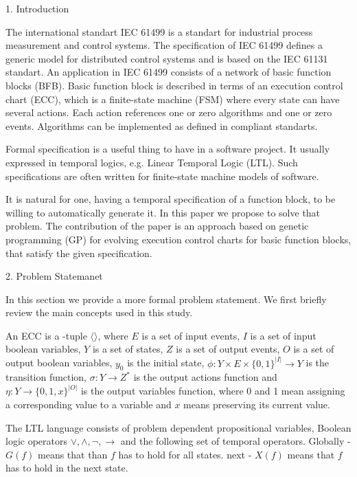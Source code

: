 1. Introduction

The international standart IEC 61499 is a standart for industrial process measurement and control systems.
The specification of IEC 61499 defines a generic model for distributed control systems and is based on the IEC 61131 standart.
An application in IEC 61499 consists of a network of basic function blocks (BFB). Basic function block is described in terms
of an execution control chart (ECC), which is a finite-state machine (FSM) where every state can have several actions.
Each action references one or zero algorithms and one or zero events. Algorithms can be implemented as defined in compliant standarts.

Formal specification is a useful thing to have in a software project. It usually expressed in temporal logics, e.g.
Linear Temporal Logic (LTL). Such specifications are often written for finite-state machine models of software.

It is natural for one, having a temporal specification of a function block, to be willing to automatically generate it.
In this paper we propose to solve that problem. The contribution of the paper is an approach based on genetic programming (GP)
for evolving execution control charts for basic function blocks, that satisfy the given specification.

2. Problem Statemanet

In this section we provide a more formal problem statement. We first briefly review the main concepts used in this study.

An ECC is a -tuple $\langle \rangle$, where $E$ is a set of input events, $I$ is a set of input boolean variables,
$Y$ is a set of states, $Z$ is a set of output events, $O$ is a set of output boolean variables, $y_0$ is the initial state,
$\phi : Y \times E \times \{0,1\}^{|I|} \rightarrow Y$ is the transition function, $\sigma : Y \rightarrow Z^*$ is the output
actions function and $\eta : Y \rightarrow \{0,1,x\}^{|O|}$ is the output variables function, where 0 and 1 mean assigning a
corresponding value to a variable and $x$ means preserving its current value.

The LTL language consists of problem dependent propositional variables, Boolean logic operators $\vee, \wedge, \lnot, \rightarrow$
and the following set of temporal operators. Globally - $G(f)$ means that than $f$ has to hold for all states. next - $X(f)$ means
that $f$ has to hold in the next state.
